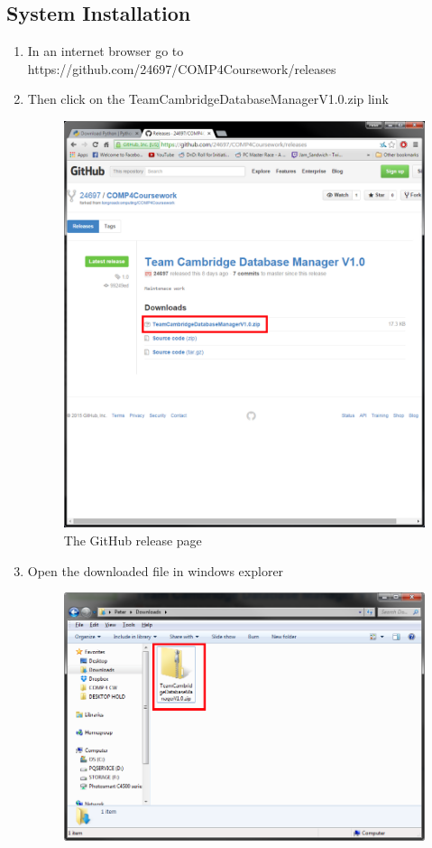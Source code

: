 \subsection{System Installation}
\begin{enumerate}
\item In an internet browser go to https://github.com/24697/COMP4Coursework/releases
\item Then click on the TeamCambridgeDatabaseManagerV1.0.zip link
\begin{figure}[H]
\includegraphics[width=\textwidth]{./Manual/SystemInstall/Part1.png}
\caption{The GitHub release page} \label{fig:SyIsP1}
\end{figure}
\item Open the downloaded file in windows explorer
\begin{figure}[H]
\includegraphics[width=\textwidth]{./Manual/SystemInstall/Part2.png}

\end{figure}
\end{enumerate}
